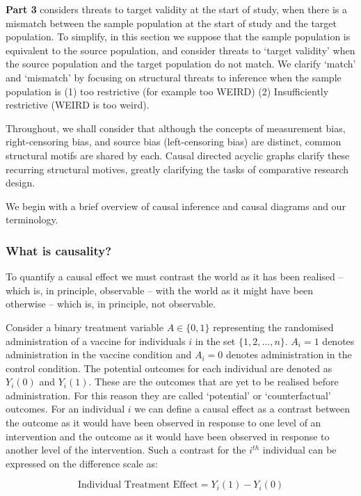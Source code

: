 \documentclass[
  single column]{article}
\begin{document}
\textbf{Part 3} considers threats to target validity at the start of
study, when there is a mismatch between the sample population at the
start of study and the target population. To simplify, in this section
we suppose that the sample population is equivalent to the source
population, and consider threats to `target validity' when the source
population and the target population do not match. We clarify `match'
and `mismatch' by focusing on structural threats to inference when the
sample population is (1) too restrictive (for example too WEIRD) (2)
Insufficiently restrictive (WEIRD is too weird).

Throughout, we shall consider that although the concepts of measurement
bias, right-censoring bias, and source bias (left-censoring bias) are
distinct, common structural motifs are shared by each. Causal directed
acyclic graphs clarify these recurring structural motives, greatly
clarifying the tasks of comparative research design.

We begin with a brief overview of causal inference and causal diagrams
and our terminology.

\subsubsection{What is causality?}\label{what-is-causality}

To quantify a causal effect we must contrast the world as it has been
realised -- which is, in principle, observable -- with the world as it
might have been otherwise -- which is, in principle, not observable.

Consider a binary treatment variable \(A \in \{0,1\}\) representing the
randomised administration of a vaccine for individuals \(i\) in the set
\(\{1, 2, \ldots, n\}\). \(A_i = 1\) denotes administration in the
vaccine condition and \(A_i = 0\) denotes administration in the control
condition. The potential outcomes for each individual are denoted as
\(Y_i(0)\) and \(Y_i(1)\). These are the outcomes that are yet to be
realised before administration. For this reason they are called
`potential' or `counterfactual' outcomes. For an individual \(i\) we can
define a causal effect as a contrast between the outcome as it would
have been observed in response to one level of an intervention and the
outcome as it would have been observed in response to another level of
the intervention. Such a contrast for the \(i^{th}\) individual can be
expressed on the difference scale as:

\[
\text{Individual Treatment Effect} = Y_i(1) - Y_i(0)
\]
\end{document}
